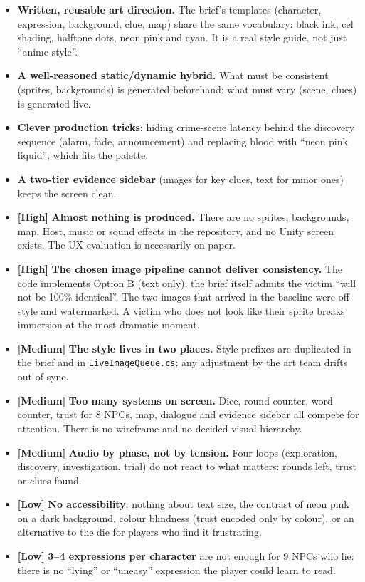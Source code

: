 \documentclass[11pt,a4paper]{article}
\newcommand{\file}[1]{\texttt{\small #1}}
\newcommand{\prio}[1]{\textbf{\color{neon}[#1]}}
\begin{document}
\begin{fuerte}
\begin{itemize}
\item \textbf{Written, reusable art direction.} The brief's templates (character, expression,
background, clue, map) share the same vocabulary: black ink, cel shading, halftone dots, neon pink
and cyan. It is a real style guide, not just ``anime style''.
\item \textbf{A well-reasoned static/dynamic hybrid.} What must be consistent (sprites,
backgrounds) is generated beforehand; what must vary (scene, clues) is generated live.
\item \textbf{Clever production tricks}: hiding crime-scene latency behind the discovery sequence
(alarm, fade, announcement) and replacing blood with ``neon pink liquid'', which fits the palette.
\item \textbf{A two-tier evidence sidebar} (images for key clues, text for minor ones) keeps the
screen clean.
\end{itemize}
\end{fuerte}

\begin{debil}
\begin{itemize}
\item \prio{High} \textbf{Almost nothing is produced.} There are no sprites, backgrounds, map, Host,
music or sound effects in the repository, and no Unity screen exists. The UX evaluation is
necessarily on paper.
\item \prio{High} \textbf{The chosen image pipeline cannot deliver consistency.} The code implements
Option B (text only); the brief itself admits the victim ``will not be 100\% identical''. The two
images that arrived in the baseline were off-style and watermarked. A victim who does not look like
their sprite breaks immersion at the most dramatic moment.
\item \prio{Medium} \textbf{The style lives in two places.} Style prefixes are duplicated in the brief
and in \file{LiveImageQueue.cs}; any adjustment by the art team drifts out of sync.
\item \prio{Medium} \textbf{Too many systems on screen.} Dice, round counter, word counter, trust for 8
NPCs, map, dialogue and evidence sidebar all compete for attention. There is no wireframe and no
decided visual hierarchy.
\item \prio{Medium} \textbf{Audio by phase, not by tension.} Four loops (exploration, discovery,
investigation, trial) do not react to what matters: rounds left, trust or clues found.
\item \prio{Low} \textbf{No accessibility}: nothing about text size, the contrast of neon pink on a
dark background, colour blindness (trust encoded only by colour), or an alternative to the die for
players who find it frustrating.
\item \prio{Low} \textbf{3--4 expressions per character} are not enough for 9 NPCs who lie: there is
no ``lying'' or ``uneasy'' expression the player could learn to read.
\end{itemize}
\end{debil}
\end{document}
